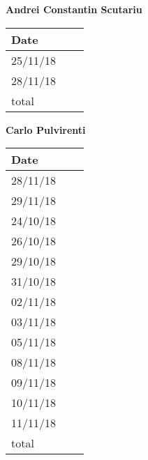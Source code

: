 \documentclass[../main.tex]{subfiles}
\begin{document}
\begin{center}
{\bf Andrei Constantin Scutariu}
	\vspace{2mm}

		\begin{tabular}{p{1.3cm}|p{1.8cm}|p{6.7cm}}
			\hline
			\bf Date & \bf \makebox[1.8cm][c]{Hours} & \bf \makebox[6.7cm][c]{Description} \\
			\hline
			25/11/18 & \makebox[1.8cm][c]{0.5h} & \makebox[6.7cm][c]{Initial Structure}\\
			28/11/18 & \makebox[1.8cm][c]{0.5h} & \makebox[6.7cm][c]{Introduction}\\
			total    & \makebox[1.8cm][c]{1h}
		\end{tabular}
\end{center}
\vspace{1cm}

\begin{center}
	{\bf Carlo Pulvirenti}
	\vspace{2mm}

		\begin{tabular}{p{1.3cm}|p{1.8cm}|p{6.7cm}}
			\hline
			\bf Date & \bf \makebox[1.8cm][c]{Hours} & \bf \makebox[6.7cm][c]{Description} \\
			\hline
			28/11/18 & \makebox[1.8cm][c]{1h} & \makebox[6.7cm][c]{Runtime View}\\
			29/11/18 & \makebox[1.8cm][c]{3h} & \makebox[6.7cm][c]{Runtime View}\\
			24/10/18 & \makebox[1.8cm][c]{4h} & \makebox[6.7cm][c]{Goals, Requirements, Domain assumptions}\\
			26/10/18 & \makebox[1.8cm][c]{2h} & \makebox[6.7cm][c]{Purpose, Scope}\\
			29/10/18 & \makebox[1.8cm][c]{6h} & \makebox[6.7cm][c]{Use Cases}\\
			31/10/18 & \makebox[1.8cm][c]{6h} & \makebox[6.7cm][c]{Use Cases, Scenarios}\\
			02/11/18 & \makebox[1.8cm][c]{4h} & \makebox[6.7cm][c]{Scenarios}\\
			03/11/18 & \makebox[1.8cm][c]{1h} & \makebox[6.7cm][c]{UML Class \& State Machine Diagrams}\\
			05/11/18 & \makebox[1.8cm][c]{4h} & \makebox[6.7cm][c]{Scenarios, Sequence Diagrams}\\
			08/11/18 & \makebox[1.8cm][c]{2h} & \makebox[6.7cm][c]{Sequence Diagramm, Alloy}\\
			09/11/18 & \makebox[1.8cm][c]{2h} & \makebox[6.7cm][c]{Sequence Diagram, Revisioning}\\
			10/11/18 & \makebox[1.8cm][c]{2h} & \makebox[6.7cm][c]{Revisioning}\\
			11/11/18 & \makebox[1.8cm][c]{4h} & \makebox[6.7cm][c]{Revisioning}\\
			total    & \makebox[1.8cm][c]{42h}
		\end{tabular}
\end{center}
\end{document}
